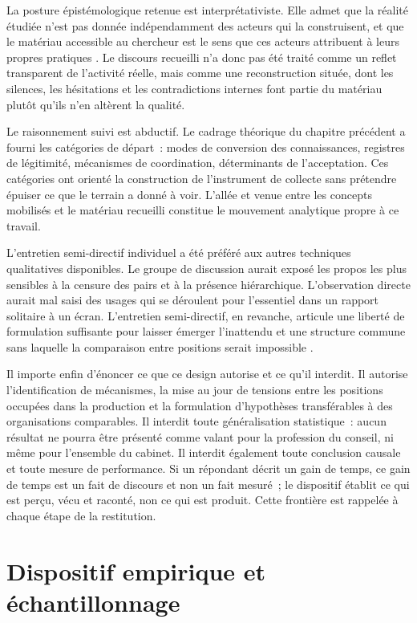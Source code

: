 La posture épistémologique retenue est interprétativiste. Elle admet que la réalité
étudiée n'est pas donnée indépendamment des acteurs qui la construisent, et que le
matériau accessible au chercheur est le sens que ces acteurs attribuent à leurs propres
pratiques \cite{gavardperret2018}. Le discours recueilli n'a donc pas été traité comme
un reflet transparent de l'activité réelle, mais comme une reconstruction située, dont
les silences, les hésitations et les contradictions internes font partie du matériau
plutôt qu'ils n'en altèrent la qualité.

Le raisonnement suivi est abductif. Le cadrage théorique du chapitre précédent a fourni
les catégories de départ~: modes de conversion des connaissances, registres de
légitimité, mécanismes de coordination, déterminants de l'acceptation. Ces catégories
ont orienté la construction de l'instrument de collecte sans prétendre épuiser ce que le
terrain a donné à voir. L'allée et venue entre les concepts mobilisés et le matériau
recueilli constitue le mouvement analytique propre à ce travail.

L'entretien semi-directif individuel a été préféré aux autres techniques qualitatives
disponibles. Le groupe de discussion aurait exposé les propos les plus sensibles à la
censure des pairs et à la présence hiérarchique. L'observation directe aurait mal
saisi des usages qui se déroulent pour l'essentiel dans un rapport solitaire à un
écran. L'entretien semi-directif, en revanche, articule une liberté de formulation
suffisante pour laisser émerger l'inattendu et une structure commune sans laquelle la
comparaison entre positions serait impossible \cite{blanchet2007}.

Il importe enfin d'énoncer ce que ce design autorise et ce qu'il interdit. Il autorise
l'identification de mécanismes, la mise au jour de tensions entre les positions
occupées dans la production et la formulation d'hypothèses transférables à des
organisations comparables. Il interdit toute généralisation statistique~: aucun
résultat ne pourra être présenté comme valant pour la profession du conseil, ni même
pour l'ensemble du cabinet. Il interdit également toute conclusion causale et toute
mesure de performance. Si un répondant décrit un gain de temps, ce gain de temps est un
fait de discours et non un fait mesuré~; le dispositif établit ce qui est perçu, vécu et
raconté, non ce qui est produit. Cette frontière est rappelée à chaque étape de la
restitution.

\section{Dispositif empirique et échantillonnage}

